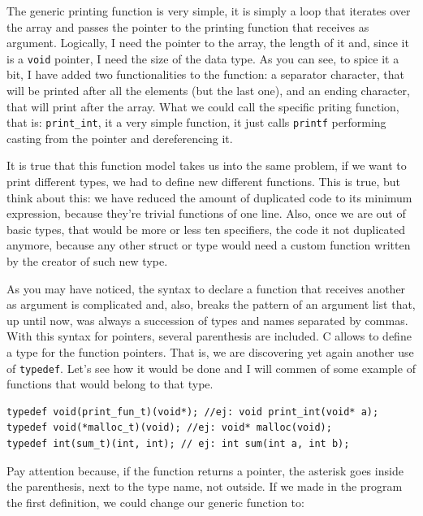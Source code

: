 \documentclass[a4paper]{article}
\begin{document}
The generic printing function is very simple, it is simply a loop that iterates
over the array and passes the pointer to the printing function that receives as
argument. Logically, I need the pointer to the array, the length of it and,
since it is a \verb!void! pointer, I need the size of the data type. As you can
see, to spice it a bit, I have added two functionalities to the function: a
separator character, that will be printed after all the elements (but the last
one), and an ending character, that will print after the array. What we could
call the specific priting function, that is: \verb!print_int!, it a very simple
function, it just calls \verb!printf! performing casting from the pointer and
dereferencing it.

It is true that this function model takes us into the same problem, if we want
to print different types, we had to define new different functions. This is
true, but think about this: we have reduced the amount of duplicated code to
its minimum expression, because they're trivial functions of one line. Also,
once we are out of basic types, that would be more or less ten specifiers, the
code it not duplicated anymore, because any other struct or type would need a
custom function written by the creator of such new type.

As you may have noticed, the syntax to declare a function that receives another
as argument is complicated and, also, breaks the pattern of an argument list
that, up until now, was always a succession of types and names separated by
commas. With this syntax for pointers, several parenthesis are included. C
allows to define a type for the function pointers. That is, we are discovering
yet again another use of \verb!typedef!. Let's see how it would be done and I
will commen of some example of functions that would belong to that type.

\noindent
\begin{minipage}[H]{\linewidth}
\mbox{}
\begin{lstlisting}[style=C,
caption={Function pointer type definition},
label={lst:functionPointerTypedef}]
typedef void(print_fun_t)(void*); //ej: void print_int(void* a);
typedef void(*malloc_t)(void); //ej: void* malloc(void);
typedef int(sum_t)(int, int); // ej: int sum(int a, int b);
\end{lstlisting}
\end{minipage}
Pay attention because, if the function returns a pointer, the asterisk goes
inside the parenthesis, next to the type name, not outside. If we made in the
program the first definition, we could change our generic function to:
\end{document}
